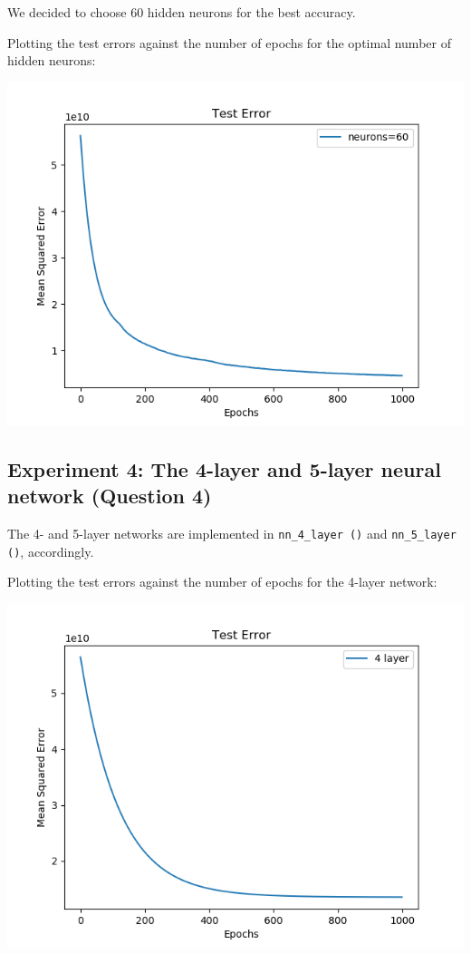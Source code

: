 We decided to choose 60 hidden neurons for the best accuracy.

Plotting the test errors against the number of epochs for the optimal
number of hidden neurons:

\begin{center}
    \includegraphics[width=\imgw]{images/p1b3_neuron_test.png}   
\end{center}

\subsection*{Experiment 4: The 4-layer and 5-layer neural network (Question 4)}

The 4- and 5-layer networks are implemented in \texttt{nn\_4\_layer\,()}
and \texttt{nn\_5\_layer\,()}, accordingly.

Plotting the test errors against the number of epochs for the 4-layer
network:

\begin{center}
    \includegraphics[width=\imgw]{images/p1b4_4layer_test.png}   
\end{center}

